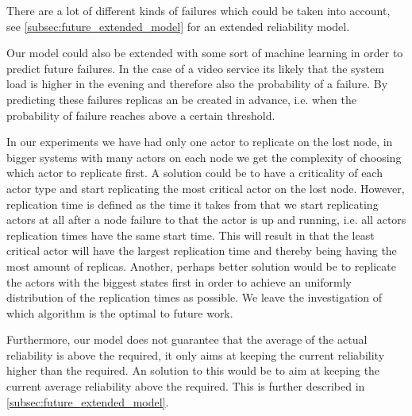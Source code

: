 \documentclass{cslthse-msc}
\begin{document}
There are a lot of different kinds of failures which could be taken into account, see \cref{subsec:future_extended_model} for an extended reliability model.

Our model could also be extended with some sort of machine learning in order to predict future failures. In the case of a video service its likely that the system load is higher in the evening and therefore also the probability of a failure. By predicting these failures replicas an be created in advance, i.e. when the probability of failure reaches above a certain threshold.

In our experiments we have had only one actor to replicate on the lost node, in bigger systems with many actors on each node we get the complexity of choosing which actor to replicate first. A solution could be to have a criticality of each actor type and start replicating the most critical actor on the lost node. However, replication time is defined as the time it takes from that we start replicating actors at all after a node failure to that the actor is up and running, i.e. all actors replication times have the same start time. This will result in that the least critical actor will have the largest replication time and thereby being having the most amount of replicas. 
Another, perhaps better solution would be to replicate the actors with the biggest states first in order to achieve an uniformly distribution of the replication times as possible. We leave the investigation of which algorithm is the optimal to future work.

Furthermore, our model does not guarantee that the average of the actual reliability is above the required, it only aims at keeping the current reliability higher than the required. An solution to this would be to aim at keeping the current average reliability above the required. This is further described in \cref{subsec:future_extended_model}. 

\end{document}
